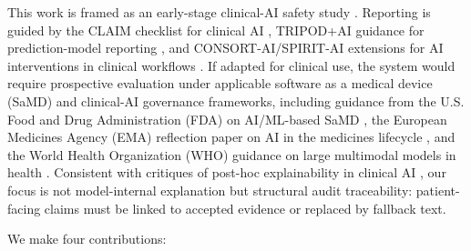 \documentclass[pdflatex,Numbered]{sn-jnl}
\theoremstyle{plain}
\begin{document}
This work is framed as an early-stage clinical-AI safety study \citep{vasey2022decideai}. Reporting is guided by the CLAIM checklist for clinical AI \citep{mongan2020claim}, TRIPOD+AI guidance for prediction-model reporting \citep{collins2024tripodai}, and CONSORT-AI/SPIRIT-AI extensions for AI interventions in clinical workflows \citep{liu2020spiritai}. If adapted for clinical use, the system would require prospective evaluation under applicable software as a medical device (SaMD) and clinical-AI governance frameworks, including guidance from the U.S. Food and Drug Administration (FDA) on AI/ML-based SaMD \citep{fda2021samdaction}, the European Medicines Agency (EMA) reflection paper on AI in the medicines lifecycle \citep{ema2024reflection}, and the World Health Organization (WHO) guidance on large multimodal models in health \citep{who2024llm}. Consistent with critiques of post-hoc explainability in clinical AI \citep{ghassemi2021falsehope}, our focus is not model-internal explanation but structural audit traceability: patient-facing claims must be linked to accepted evidence or replaced by fallback text.

We make four contributions:
\end{document}
